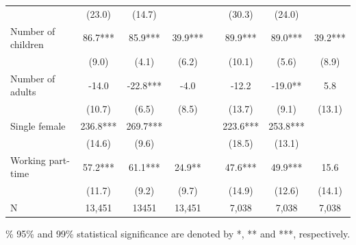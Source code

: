 \begin{center}
\begin{threeparttable}
\begin{footnotesize}
\begin{tabular}{lccccccc}
                     &      (23.0)   &      (14.7)   &               &&      (30.3)   &      (24.0)   &                \\
Number of children   &        86.7***&        85.9***&        39.9***&&        89.9***&        89.0***&        39.2*** \\
                     &       (9.0)   &       (4.1)   &       (6.2)   &&      (10.1)   &       (5.6)   &       (8.9)    \\
Number of adults     &       -14.0   &       -22.8***&        -4.0   &&       -12.2   &       -19.0** &         5.8    \\
                     &      (10.7)   &       (6.5)   &       (8.5)   &&      (13.7)   &       (9.1)   &      (13.1)    \\
Single female        &       236.8***&       269.7***&               &&       223.6***&       253.8***&                \\
                     &      (14.6)   &       (9.6)   &               &&      (18.5)   &      (13.1)   &                \\
Working part-time    &        57.2***&        61.1***&        24.9** &&        47.6***&        49.9***&        15.6    \\
                     &      (11.7)   &       (9.2)   &       (9.7)   &&      (14.9)   &      (12.6)   &      (14.1)    \\
N                    &       13,451  &       13451   &       13,451  &&        7,038  &        7,038  &        7,038   \\

\hline\hline
\end{tabular}
\end{footnotesize}
\begin{tablenotes}
\item[] \footnotesize{\% 95\% and 99\% statistical
significance are denoted by *, ** and ***, respectively.}
\end{tablenotes}
\label{Analysis}
\end{threeparttable}
\end{center}

